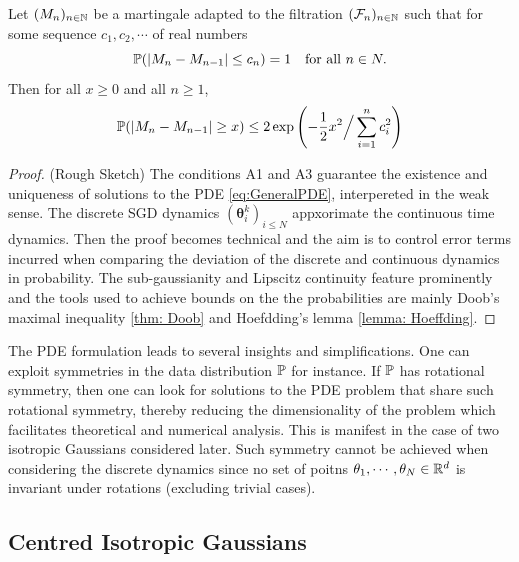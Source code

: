 \documentclass{article}
\begin{document}
\begin{boxlemma}\label{lemma: Hoeffding}
Let $ (M_{n})_{n\in\mathbb{N}}$ be a martingale adapted to the filtration $ (\mathcal{F}_{n})_{n\in\mathbb{N}}$ such that for some sequence $ c_{1}, c_{2},\cdots$ of real numbers 
\begin{equation}
	\mathbb{P}(|M_{n}-M_{n-1}|\leq c_{n}) = 1 \quad \text{for all } n\in N.
\end{equation}
Then for all $ x\geq 0$ and all $ n\geq 1$,
\begin{equation}
    \mathbb{P}(|M_{n}-M_{n-1}|\geq x)\leq 2 \exp \left( -\frac{1}{2}x^{2}\Big/\displaystyle\sum^{n}_{i=1}c_{i}^{2}  \right)
\end{equation}


\end{boxlemma}


\begin{proof}{(Rough Sketch)}
	The conditions {\sf A1} and {\sf A3} guarantee the existence and uniqueness of solutions to the PDE \ref{eq:GeneralPDE}, interpereted in the weak sense. The discrete SGD dynamics $ (\mathbf{\theta}_{i}^{k})_{i\leq N }$ appxorimate the continuous time dynamics. Then the proof becomes technical and the aim is to control error terms incurred when comparing the deviation of the discrete and continuous dynamics in probability. The sub-gaussianity and Lipscitz continuity feature prominently and the tools used to achieve bounds on the the probabilities are mainly Doob's maximal inequality \ref{thm: Doob} and Hoefdding's lemma \ref{lemma: Hoeffding}. 
\end{proof}

The PDE formulation leads to several insights and simplifications. One can exploit symmetries in the data distribution $ \mathbb{P}$ for instance. If $ \mathbb{P}$ has rotational symmetry, then one can look for solutions to the PDE problem that share such rotational symmetry, thereby reducing the dimensionality of the problem which facilitates theoretical and numerical analysis. This is manifest in the case of two isotropic Gaussians considered later. Such symmetry cannot be achieved when considering the discrete dynamics since no set of poitns $ \mathbf{\theta}_{1}, \cdots, \mathbf{\theta}_{N}\in \mathbb{R}^{d}$ is invariant under rotations (excluding trivial cases).


\subsection{Centred Isotropic Gaussians}
\end{document}
